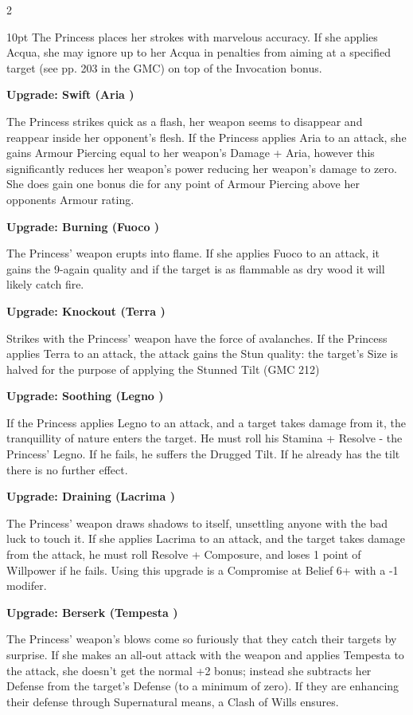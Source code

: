 \begin{multicols}{2}
\begin{myindentpar}{10pt}
The Princess places her strokes with marvelous accuracy. If she applies Acqua, she may ignore up to her Acqua in penalties from aiming at a specified target (see pp. 203 in the GMC) on top of the Invocation bonus.

\textbf{Upgrade: Swift (Aria \textbullet\textbullet)}

The Princess strikes quick as a flash, her weapon seems to disappear and reappear inside her opponent's flesh. If the Princess applies Aria to an attack, she gains Armour Piercing equal to her weapon's Damage + Aria, however this significantly reduces her weapon's power reducing her weapon's damage to zero. She does gain one bonus die for any point of Armour Piercing above her opponents Armour rating. 

\textbf{Upgrade: Burning (Fuoco \textbullet\textbullet)}

The Princess' weapon erupts into flame. If she applies Fuoco to an attack, it gains the 9-again quality and if the target is as flammable as dry wood it will likely catch fire. 

\textbf{Upgrade: Knockout (Terra \textbullet\textbullet)}

Strikes with the Princess' weapon have the force of avalanches. If the Princess applies Terra to an attack, the attack gains the Stun quality: the target's Size is halved for the purpose of applying the Stunned Tilt (GMC 212)

\textbf{Upgrade: Soothing (Legno \textbullet\textbullet)}

If the Princess applies Legno to an attack, and a target takes damage from it, the tranquillity of nature enters the target. He must roll his Stamina + Resolve - the Princess' Legno. If he fails, he suffers the Drugged Tilt. If he already has the tilt there is no further effect. 

\textbf{Upgrade: Draining (Lacrima \textbullet\textbullet)}

The Princess' weapon draws shadows to itself, unsettling anyone with the bad luck to touch it. If she applies Lacrima to an attack, and the target takes damage from the attack, he must roll Resolve + Composure, and loses 1 point of Willpower if he fails. Using this upgrade is a Compromise at Belief 6+ with a -1 modifer.

\textbf{Upgrade: Berserk (Tempesta \textbullet\textbullet)}

The Princess' weapon's blows come so furiously that they catch their targets by surprise. If she makes an all-out attack with the weapon and applies Tempesta to the attack, she doesn't get the normal +2 bonus; instead she subtracts her Defense from the target's Defense (to a minimum of zero). If they are enhancing their defense through Supernatural means, a Clash of Wills ensures.\end{myindentpar}



\end{multicols}
